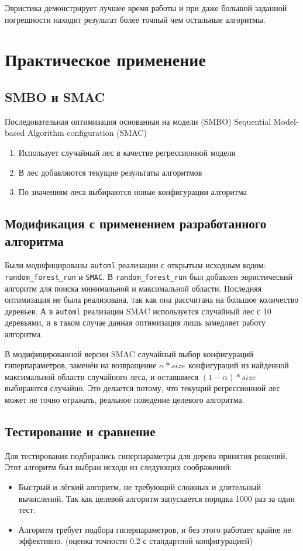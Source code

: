 \documentclass[pscyr,specification,annotation]{itmo-student-thesis}
\begin{document}
\chapterconclusion{}
    Эвристика демонстрирует лучшее время работы и при даже большой заданной погрешности 
    находит результат более точный чем остальные алгоритмы.

\chapter{Практическое применение}
\section{SMBO и SMAC}
    Последовательная оптимизация основанная на модели (SMBO) Sequential Model-based Algorithm configuration\cite{smbo} (SMAC)
    \begin{enumerate}
    \item Использует случайный лес в качестве регрессионной модели\cite{usesmbo}
    \item В лес добавляются текущие результаты алгоритмов
    \item По значениям леса выбираются новые конфигурации алгоритма
    \end{enumerate}
\section{Модификация с применением разработанного алгоритма}
    Были модифицированы \texttt{automl} реализации с открытым исходным кодом: 
    \texttt{random\_forest\_run} и \texttt{SMAC}. В \texttt{random\_forest\_run} был добавлен
    эвристический алгоритм для поиска минимальной и максимальной области. Последняя оптимизация
    не была реализована, так как она рассчитана на большое количество деревьев. А в \texttt{automl}
    реализации SMAC используется случайный лес с 10 деревьями, и в таком случае данная оптимизация
    лишь замедляет работу алгоритма.

    В модифицированной версии SMAC случайный выбор конфигураций гиперпараметров, заменён на
    возвращение $\alpha * size$ конфигураций из найденной максимальной области случайного леса,
    и оставшиеся $(1 - \alpha) * size$ выбираются случайно. Это делается потому, что текущий 
    регрессионной лес может не точно отражать, реальное поведение целевого алгоритма.
\section{Тестирование и сравнение}
    Для тестирования подбирались гиперпараметры для дерева принятия решений. Этот алгоритм был
    выбран исходя из следующих соображений:
    \begin{itemize}
    \item Быстрый и лёгкий алгоритм, не требующий сложных и длительный вычислений. 
        Так как целевой алгоритм запускается порядка 1000 раз за один тест.
    \item Алгоритм требует подбора гиперпараметров, и без этого работает крайне не эффективно.
        (оценка точности 0.2 с стандартной конфигурацией)
    \end{itemize}
\end{document}
